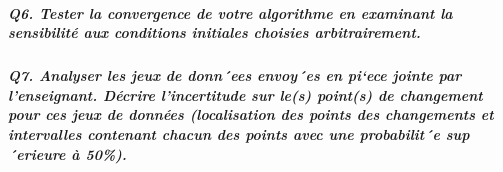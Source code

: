 \documentclass[
]{article}
\begin{document}
\subparagraph{Q6. Tester la convergence de votre algorithme en examinant
la sensibilité aux conditions initiales choisies
arbitrairement.}\label{q6.-tester-la-convergence-de-votre-algorithme-en-examinant-la-sensibilituxe9-aux-conditions-initiales-choisies-arbitrairement.}

\subparagraph{Q7. Analyser les jeux de donn´ees envoy´es en pi`ece
jointe par l'enseignant. Décrire l'incertitude sur le(s) point(s) de
changement pour ces jeux de données (localisation des points des
changements et intervalles contenant chacun des points avec une
probabilit´e sup´erieure à
50\%).}\label{q7.-analyser-les-jeux-de-donnees-envoyes-en-piece-jointe-par-lenseignant.-duxe9crire-lincertitude-sur-les-points-de-changement-pour-ces-jeux-de-donnuxe9es-localisation-des-points-des-changements-et-intervalles-contenant-chacun-des-points-avec-une-probabilite-superieure-uxe0-50.}
\end{document}
